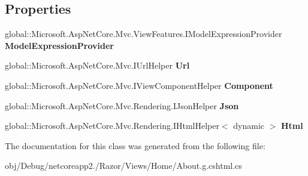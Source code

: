 \subsection*{Properties}
\begin{DoxyCompactItemize}
\item 
\mbox{\label{class_asp_net_core_1_1_views___home___about_a3629f4b2236d4d65cb43b55b333c242b}} 
global\+::\+Microsoft.\+Asp\+Net\+Core.\+Mvc.\+View\+Features.\+I\+Model\+Expression\+Provider {\bfseries Model\+Expression\+Provider}
\item 
\mbox{\label{class_asp_net_core_1_1_views___home___about_a2aee90ec4423fff6b900c2f3b949e23d}} 
global\+::\+Microsoft.\+Asp\+Net\+Core.\+Mvc.\+I\+Url\+Helper {\bfseries Url}
\item 
\mbox{\label{class_asp_net_core_1_1_views___home___about_ad7a6a647850ba3921f1be7e0507383a9}} 
global\+::\+Microsoft.\+Asp\+Net\+Core.\+Mvc.\+I\+View\+Component\+Helper {\bfseries Component}
\item 
\mbox{\label{class_asp_net_core_1_1_views___home___about_a0f1537d74719fb0e14c561c1c90c06a7}} 
global\+::\+Microsoft.\+Asp\+Net\+Core.\+Mvc.\+Rendering.\+I\+Json\+Helper {\bfseries Json}
\item 
\mbox{\label{class_asp_net_core_1_1_views___home___about_a4ef0b8beab9f3b16c9ec89df81d34c58}} 
global\+::\+Microsoft.\+Asp\+Net\+Core.\+Mvc.\+Rendering.\+I\+Html\+Helper$<$ dynamic $>$ {\bfseries Html}
\end{DoxyCompactItemize}


The documentation for this class was generated from the following file\+:\begin{DoxyCompactItemize}
\item 
obj/\+Debug/netcoreapp2./\+Razor/\+Views/\+Home/About.\+g.\+cshtml.\+cs\end{DoxyCompactItemize}
